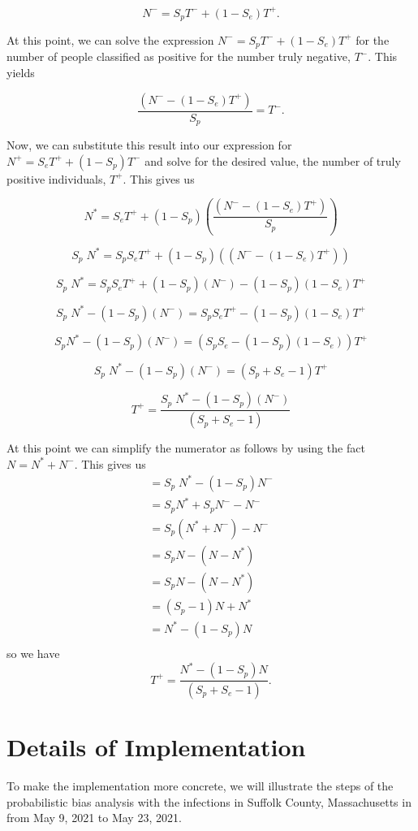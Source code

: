 \documentclass[12pt,twoside]{smiththesis}
\begin{document}
\[ N^- = S_p T^- + (1-S_e) T^+.\]

At this point, we can solve the expression \(N^- = S_p T^- + (1-S_e) T^+\) for the number of people classified as positive for the number truly negative, \(T^-\). This yields

\[\dfrac{( N^- - (1-S_e) T^+) }{S_p}=  T^- .\]

Now, we can substitute this result into our expression for \(N^+ =S_e T^+ + (1-S_p) T^-\) and solve for the desired value, the number of truly positive individuals, \(T^+\). This gives us

\[
 N^* =S_e T^+ + (1-S_p)  \left( \dfrac{( N^- - (1-S_e) T^+) }{S_p} \right)
\]

\[
 S_p \; N^* =S_pS_e T^+ + (1-S_p)  \left( {( N^- - (1-S_e) T^+) } \right)
\]

\[
 S_p \; N^* =S_pS_e T^+ + (1-S_p)  ( N^-)  - (1-S_p)(1-S_e) T^+
\]

\[
 S_p \; N^* -   (1-S_p)  ( N^-) =S_pS_e T^+  - (1-S_p)(1-S_e) T^+
\]

\[
 S_p N^* -   (1-S_p)  ( N^-) = (S_pS_e  - (1-S_p)(1-S_e)) T^+
\]

\[
 S_p \; N^* -   (1-S_p)  ( N^-) = (S_p + S_e - 1) T^+
\]

\[
 T^+ = \dfrac{ S_p \; N^* -   (1-S_p)  ( N^-)}{(S_p + S_e - 1)} 
\]

At this point we can simplify the numerator as follows by using the fact \(N =N^* + N^-\). This gives us
\begin{align*} =S_p \;N^* -   (1-S_p)  N^-\\
=  S_p   N^* + S_p  N^- - N^-\\
=  S_p(N^* +  N^-) - N^- \\
=  S_pN - (N-N^*) \\
=  S_pN - (N-N^*) \\
=  (S_p-1)N + N^* \\
=  N^* - (1-S_p)N\\
\end{align*}
so we have
\[
 T^+ = \dfrac{ N^*- (1-S_p)N}{(S_p + S_e - 1)}.
\]

\hypertarget{details-of-implementation}{%
\chapter{Details of Implementation}\label{details-of-implementation}}

To make the implementation more concrete, we will illustrate the steps of the probabilistic bias analysis with the infections in Suffolk County, Massachusetts in from May 9, 2021 to May 23, 2021.
\end{document}

